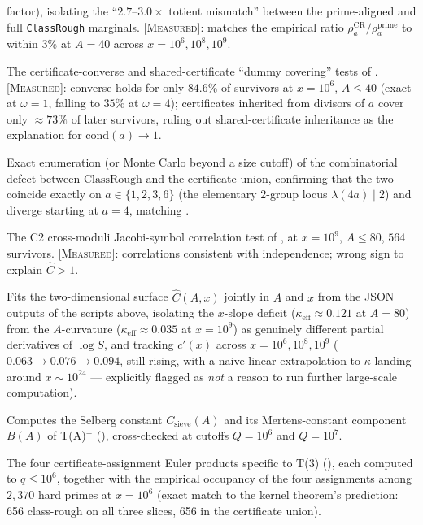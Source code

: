 \documentclass[11pt]{article}
\theoremstyle{plain}
\theoremstyle{definition}
\theoremstyle{remark}
\newcommand{\MEASURED}{\textcolor{claimed}{\textsc{[Measured]}}}
\newcommand{\file}[1]{\texttt{#1}}
\newcommand{\lean}[1]{\texttt{#1}}
\renewcommand{\_}{\textunderscore\allowbreak}
\begin{document}
\begin{description}[leftmargin=1.6em]
        factor), isolating the ``$2.7$--$3.0\times$ totient mismatch'' between the prime-aligned
        and full \lean{ClassRough} marginals. \MEASURED{}: matches the empirical ratio
        $\rho_a^{\mathrm{CR}}/\rho_a^{\mathrm{prime}}$ to within $3\%$ at $A=40$ across
        $x=10^6,10^8,10^9$.
  \item[\file{c4\_certificates.py}] The certificate-converse and shared-certificate ``dummy
        covering'' tests of . \MEASURED{}: converse holds for only $84.6\%$ of
        survivors at $x=10^6$, $A\le40$ (exact at $\omega=1$, falling to $35\%$ at $\omega=4$);
        certificates inherited from divisors of $a$ cover only $\approx73\%$ of later survivors,
        ruling out shared-certificate inheritance as the explanation for
        $\mathrm{cond}(a)\to1$.
  \item[\file{c4\_defect\_layer.py}] Exact enumeration (or Monte Carlo beyond a size cutoff) of
        the combinatorial defect between $\mathrm{ClassRough}$ and the certificate union,
        confirming that the two coincide exactly on $a\in\{1,2,3,6\}$ (the elementary
        $2$-group locus $\lambda(4a)\mid2$) and diverge starting at $a=4$, matching
        .
  \item[\file{c4\_c2\_symbols.py}] The C2 cross-moduli Jacobi-symbol correlation test of
        , at $x=10^9$, $A\le80$, $564$ survivors. \MEASURED{}: correlations
        consistent with independence; wrong sign to explain $\widehat C>1$.
  \item[\file{c4\_surface\_fit.py}] Fits the two-dimensional surface $\widehat C(A,x)$ jointly in
        $A$ and $x$ from the JSON outputs of the scripts above, isolating the $x$-slope deficit
        ($\kappa_{\mathrm{eff}}\approx0.121$ at $A=80$) from the $A$-curvature
        ($\kappa_{\mathrm{eff}}\approx0.035$ at $x=10^9$) as genuinely different partial
        derivatives of $\log S$, and tracking $c'(x)$ across $x=10^6,10^8,10^9$
        ($0.063\to0.076\to0.094$, still rising, with a naive linear extrapolation to $\kappa$
        landing around $x\sim10^{24}$ — explicitly flagged as \emph{not} a reason to run further
        large-scale computation).
  \item[\file{c4\_sieve\_constant.py}] Computes the Selberg constant $C_{\mathrm{sieve}}(A)$ and
        its Mertens-constant component $B(A)$ of T(A)$^+$ (), cross-checked
        at cutoffs $Q=10^6$ and $Q=10^7$.
  \item[\file{c4\_t3\_euler.py}] The four certificate-assignment Euler products specific to T(3)
        (), each computed to $q\le10^6$, together with the empirical occupancy
        of the four assignments among $2{,}370$ hard primes at $x=10^6$ (exact match to the
        kernel theorem's prediction: 656 class-rough on all three slices, 656 in the certificate
        union).
\end{description}
\end{document}
